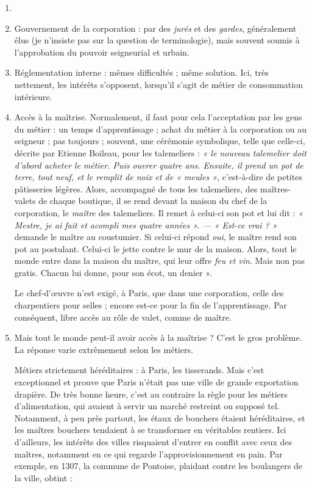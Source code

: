 \documentclass[french,twoside]{book} %
\begin{document}
\begin{enumerate}[itemsep=\baselineskip,]
\item[] \hspace{-1.5em}{\bfseries Voyons plus précisément les problèmes du droit corporatif :}
\item Gouvernement de la corporation : par des \emph{jurés} et des \emph{gardes}, généralement élus (je n’insiste pas sur la question de terminologie), mais souvent soumis à l’approbation du pouvoir seigneurial et urbain.
\item Réglementation interne : mêmes difficultés ; même solution. Ici, très nettement, les intérêts s’opposent, lorsqu’il s’agit de métier de consommation intérieure.
\item Accès à la maîtrise. Normalement, il faut pour cela l’acceptation par les gens du métier : un temps d’apprentissage ; achat du métier à la corporation ou au seigneur ; pas toujours ; souvent, une cérémonie symbolique, telle que celle-ci, décrite par Etienne Boileau, pour les talemeliers : \emph{« le nouveau talemelier doit d’abord acheter le métier. Puis ouvrer quatre ans. Ensuite, il prend un pot de terre, tout neuf, et le remplit de noix et de « meules »}, c’est-à-dire de petites pâtisseries légères. Alors, accompagné de tous les talemeliers, des maîtres-valets de chaque boutique, il se rend devant la maison du chef de la corporation, le \emph{maître} des talemeliers. Il remet à celui-ci son pot et lui dit : \emph{« Mestre, je ai fait et acompli mes quatre années ». — « Est-ce vrai ? »} demande le maître au coustumier. Si celui-ci répond \emph{oui}, le maître rend son pot au postulant. Celui-ci le jette contre le mur de la maison. Alors, tout le monde entre dans la maison du maître, qui leur offre \emph{feu et vin}. Mais non pas gratis. Chacun lui donne, pour son écot, un denier ».\par
Le chef-d’œuvre n’est exigé, à Paris, que dans une corporation, celle des charpentiers pour selles ; encore est-ce pour la fin de l’apprentissage. Par conséquent, libre accès au rôle de valet, comme de maître.

\item Mais tout le monde peut-il avoir accès à la maîtrise ? C’est le gros problème. La réponse varie extrêmement selon les métiers.\par
Métiers strictement héréditaires : à Paris, les tisserands. Mais c’est exceptionnel et prouve que Paris n’était pas une ville de grande exportation drapière. De très bonne heure, c’est au contraire la règle pour les métiers d’alimentation, qui avaient à servir un marché restreint ou supposé tel. Notamment, à peu près partout, les étaux de bouchers étaient héréditaires, et les maîtres bouchers tendaient à se transformer en véritables rentiers. Ici d’ailleurs, les intérêts des villes risquaient d’entrer en conflit avec ceux des maîtres, notamment en ce qui regarde l’approvisionnement en pain. Par exemple, en 1307, la commune de Pontoise, plaidant contre les boulangers de la ville, obtint :\par


\end{enumerate}
\end{document}
